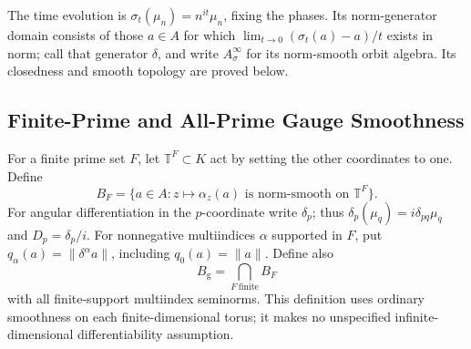 The time evolution is \(\sigma_t(\mu_n)=n^{it}\mu_n\), fixing the
phases. Its norm-generator domain consists of those \(a\in A\) for
which \(\lim_{t\to0}(\sigma_t(a)-a)/t\) exists in norm; call that
generator \(\delta\), and write \(A_\sigma^\infty\) for its
norm-smooth orbit algebra. Its closedness and smooth topology are
proved below.

\subsection{Finite-Prime and All-Prime Gauge Smoothness}

For a finite prime set \(F\), let \(\mathbb T^F\subset K\) act by
setting the other coordinates to one. Define
\[
 B_F=\{a\in A:z\mapsto\alpha_z(a)
                   \text{ is norm-smooth on }\mathbb T^F\}.
\]
For angular differentiation in the \(p\)-coordinate write
\(\delta_p\); thus \(\delta_p(\mu_q)=i\delta_{pq}\mu_q\) and
\(D_p=\delta_p/i\). For nonnegative multiindices \(\alpha\) supported
in \(F\), put \(q_\alpha(a)=\|\delta^\alpha a\|\), including
\(q_0(a)=\|a\|\). Define also
\[
 B_{\mathrm g}=\bigcap_{F\ \mathrm{finite}}B_F
\]
with all finite-support multiindex seminorms. This definition uses
ordinary smoothness on each finite-dimensional torus; it makes no
unspecified infinite-dimensional differentiability assumption.

